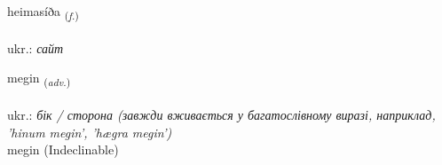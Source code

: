 \documentclass[frontgrid, backgrid]{flacards}\usepackage[]{graphicx}\usepackage[]{xcolor}
\begin{document}
\renewcommand{\flhead}{\vskip5pt \fboxsep=0pt {\small\bfseries\footnotesize Nafnorð | іменник}}
\renewcommand{\fcfoot}{\vskip5pt \fboxsep=0pt \hspace{2pt}{\small\bfseries\footnotesize 2K}}

\renewcommand{\blhead}{\vskip5pt {\small\bfseries\footnotesize Nafnorð | іменник }}
\renewcommand{\bcfoot}{\vskip5pt \hspace{2pt}{\small\bfseries\footnotesize 2K}}


{heimasíða \small{\textsubscript{(\textit{f.})}} \\[1ex] %
\textphonetic{[heiːmasiða]} \\
ukr.: \emph{сайт} \\  [2ex]
\renewcommand*{\arraystretch}{0.8}
}


\renewcommand{\flhead}{\vskip5pt \fboxsep=0pt {\small\bfseries\footnotesize Atviksorð | прислівник}}
\renewcommand{\fcfoot}{\vskip5pt \fboxsep=0pt \hspace{2pt}{\small\bfseries\footnotesize 2K}}

\renewcommand{\blhead}{\vskip5pt {\small\bfseries\footnotesize Atviksorð | прислівник }}
\renewcommand{\bcfoot}{\vskip5pt \hspace{2pt}{\small\bfseries\footnotesize 2K}}


{megin \small{\textsubscript{(\textit{adv.})}} \\[1ex]
\textphonetic{[meijɪn]} \\
ukr.: \emph{бік / сторона (завжди вживається у багатослівному виразі, наприклад, 'hinum megin', 'hægra megin')} \\  [2ex]
megin (Indeclinable)}
\end{document}
